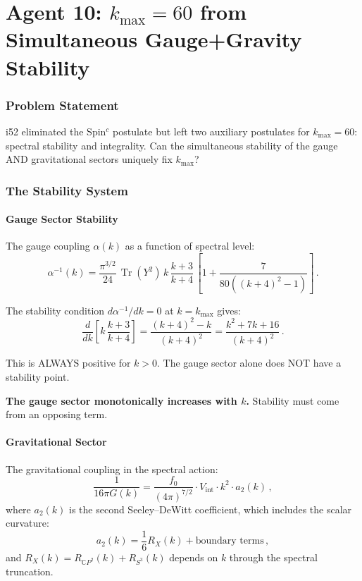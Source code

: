 \documentclass[11pt,a4paper]{article}
\newcommand{\Tr}{\operatorname{Tr}}
\newcommand{\CP}{\mathbb{C}P}
\begin{document}
\part{Agent 10: $k_{\max} = 60$ from Simultaneous Gauge+Gravity Stability}
\label{part:kmax}

\section{Problem Statement}

i52 eliminated the Spin$^c$ postulate but left two auxiliary postulates for $k_{\max} = 60$: spectral stability and integrality. Can the simultaneous stability of the gauge AND gravitational sectors uniquely fix $k_{\max}$?

\section{The Stability System}

\subsection{Gauge Sector Stability}

The gauge coupling $\alpha(k)$ as a function of spectral level:
\begin{equation}
\alpha^{-1}(k) = \frac{\pi^{3/2}}{24}\,\Tr(Y^2)\,k\,\frac{k+3}{k+4}\,\left[1 + \frac{7}{80((k+4)^2-1)}\right]\,.
\end{equation}

The stability condition $d\alpha^{-1}/dk = 0$ at $k = k_{\max}$ gives:
\begin{equation}
\frac{d}{dk}\left[k\,\frac{k+3}{k+4}\right] = \frac{(k+4)^2 - k}{(k+4)^2} = \frac{k^2 + 7k + 16}{(k+4)^2}\,.
\end{equation}

This is ALWAYS positive for $k > 0$. The gauge sector alone does NOT have a stability point.

\textbf{The gauge sector monotonically increases with $k$.} Stability must come from an opposing term.

\subsection{Gravitational Sector}

The gravitational coupling in the spectral action:
\begin{equation}
\frac{1}{16\pi G(k)} = \frac{f_0}{(4\pi)^{7/2}} \cdot V_{\mathrm{int}} \cdot k^2 \cdot a_2(k)\,,
\end{equation}
where $a_2(k)$ is the second Seeley--DeWitt coefficient, which includes the scalar curvature:
\begin{equation}
a_2(k) = \frac{1}{6}R_X(k) + \text{boundary terms}\,,
\end{equation}
and $R_X(k) = R_{\CP^2}(k) + R_{S^3}(k)$ depends on $k$ through the spectral truncation.
\end{document}
